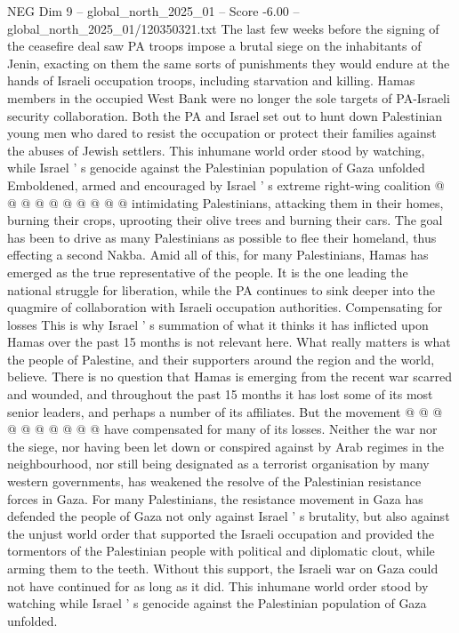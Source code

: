 \begin{textsample}{NEG Dim 9 – global\_north\_2025\_01 – Score -6.00 – global\_north\_2025\_01/120350321.txt}
The last few weeks before the signing of the ceasefire deal saw PA troops impose a brutal siege on the inhabitants of Jenin, exacting on them the same sorts of punishments they would endure at the hands of Israeli occupation troops, including starvation and killing.
Hamas members in the occupied West Bank were no longer the sole targets of PA-Israeli security collaboration.
Both the PA and Israel set out to hunt down Palestinian young men who dared to resist the occupation or protect their families against the abuses of Jewish settlers.
This inhumane world order stood by watching, while Israel ' s genocide against the Palestinian population of Gaza unfolded Emboldened, armed and encouraged by Israel ' s extreme right-wing coalition @ @ @ @ @ @ @ @ @ @ intimidating Palestinians, attacking them in their homes, burning their crops, uprooting their olive trees and burning their cars.
The goal has been to drive as many Palestinians as possible to flee their homeland, thus effecting a second Nakba.
Amid all of this, for many Palestinians, Hamas has emerged as the true representative of the people.
It is the one leading the national struggle for liberation, while the PA continues to sink deeper into the quagmire of collaboration with Israeli occupation authorities.
Compensating for losses This is why Israel ' s summation of what it thinks it has inflicted upon Hamas over the past 15 months is not relevant here.
What really matters is what the people of Palestine, and their supporters around the region and the world, believe.
There is no question that Hamas is emerging from the recent war scarred and wounded, and throughout the past 15 months it has lost some of its most senior leaders, and perhaps a number of its affiliates.
But the movement @ @ @ @ @ @ @ @ @ @ have compensated for many of its losses.
Neither the war nor the siege, nor having been let down or conspired against by Arab regimes in the neighbourhood, nor still being designated as a terrorist organisation by many western governments, has weakened the resolve of the Palestinian resistance forces in Gaza.
For many Palestinians, the resistance movement in Gaza has defended the people of Gaza not only against Israel ' s brutality, but also against the unjust world order that supported the Israeli occupation and provided the tormentors of the Palestinian people with political and diplomatic clout, while arming them to the teeth.
Without this support, the Israeli war on Gaza could not have continued for as long as it did.
This inhumane world order stood by watching while Israel ' s genocide against the Palestinian population of Gaza unfolded.

\end{textsample}
